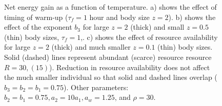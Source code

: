 \begin{figure}%
\begin{center}
\caption{
	Net energy gain as a function of temperature.
	a) shows the effect of timing of warm-up ($\tau_f = 1$ hour and body size $z = 2$). %
	b) shows the effect of the exponent $b_3$  for large $z= 2$ (thick) and small $z = 0.5$ (thin) body sizes, $\tau_f = 1$,.
	c) shows the effect of resource availability for large $z = 2$ (thick) and much smaller $z = 0.1$ (thin) body sizes.
	Solid (dashed) lines represent abundant (scarce) resource resource $R = 30, (15)$).
	Reduction in resource availability does not affect the much smaller individual so that solid and dashed lines overlap ($b_3 = b_2 = b_1 = 0.75$).
	Other parameters: $ b_2 = b_1  = 0.75,  a_2 = 10 a_1, a_w = 1.25$, and  $\rho = 30$.
}%
\label{fig6}
\end{center}
\end{figure}

